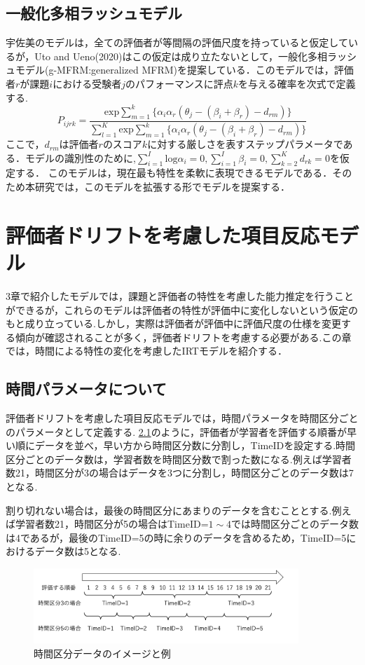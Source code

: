 \documentclass[a4paper,11pt,oneside,openany]{jsbook}
\begin{document}
\section{一般化多相ラッシュモデル}
宇佐美のモデルは，全ての評価者が等間隔の評価尺度を持っていると仮定しているが，Uto and Ueno(2020)はこの仮定は成り立たないとして，一般化多相ラッシュモデル(g-MFRM:generalized MFRM)を提案している\cite{g-MFRM}．このモデルでは，評価者$r$が課題$i$における受験者$j$のパフォーマンスに評点$k$を与える確率を次式で定義する.
\begin{displaymath}
  P_{ijrk}=\frac{\mathrm{exp}\sum_{m=1}^{k}\{\alpha_i\alpha_r(\theta_{j}-(\beta_{i}+\beta_{r})-d_{rm})\}}{\sum_{l=1}^{K}\mathrm{exp}\sum_{m=1}^{k}\{\alpha_i\alpha_r(\theta_{j}-(\beta_{i}+\beta_{r})-d_{rm})\}}
\end{displaymath}
ここで，$d_{rm}$は評価者$r$のスコア$k$に対する厳しさを表すステップパラメータである．モデルの識別性のために,$\sum^{I}_{i=1}{\mathrm{log}\alpha_i}=0,\sum^{I}_{i=1}{\beta_i}=0,\sum^{K}_{k=2}{d_{rk}}=0$を仮定する．
このモデルは，現在最も特性を柔軟に表現できるモデルである．そのため本研究では，このモデルを拡張する形でモデルを提案する．

\chapter{評価者ドリフトを考慮した項目反応モデル}
3章で紹介したモデルでは，課題と評価者の特性を考慮した能力推定を行うことができるが，これらのモデルは評価者の特性が評価中に変化しないという仮定のもと成り立っている.しかし，実際は評価者が評価中に評価尺度の仕様を変更する傾向が確認されることが多く，評価者ドリフトを考慮する必要がある.この章では，時間による特性の変化を考慮したIRTモデルを紹介する．
\section{時間パラメータについて}
評価者ドリフトを考慮した項目反応モデルでは，時間パラメータを時間区分ごとのパラメータとして定義する.
\ref{timeid}のように，評価者が学習者を評価する順番が早い順にデータを並べ，早い方から時間区分数に分割し，TimeIDを設定する.時間区分ごとのデータ数は，学習者数を時間区分数で割った数になる.例えば学習者数21，時間区分が3の場合はデータを3つに分割し，時間区分ごとのデータ数は7となる.

割り切れない場合は，最後の時間区分にあまりのデータを含むこととする.例えば学習者数21，時間区分が5の場合はTimeID=$1\sim4$では時間区分ごとのデータ数は4であるが，最後のTimeID=5の時に余りのデータを含めるため，TimeID=5におけるデータ数は5となる.
\begin{figure}[ht]
 \centering
\includegraphics[width=10cm]{img/timeid.png}
\caption{時間区分データのイメージと例}
 \label{timeid}
\end{figure}
\end{document}
